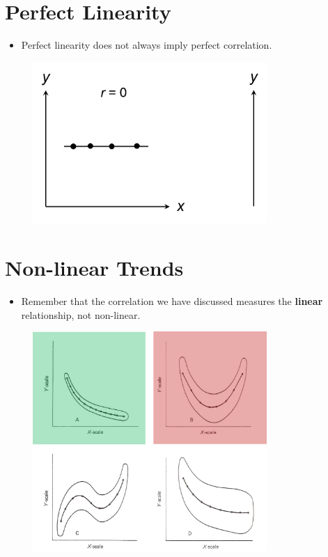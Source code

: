 \documentclass[12pt]{article}
\begin{document}
\section{Perfect Linearity}\label{perfect-linearity}

\begin{itemize}
\itemsep1pt\parskip0pt
\item
  Perfect linearity does not always imply perfect correlation.
\end{itemize}

\begin{figure}[H]
\centering
\includegraphics[width=3.5in]{perfect_nocorr.png}
\caption{}
\end{figure}

\section{Non-linear Trends}\label{non-linear-trends}

\begin{itemize}
\itemsep1pt\parskip0pt
\item
  Remember that the correlation we have discussed measures the
  \textbf{linear} relationship, not non-linear.
\end{itemize}

\begin{figure}[H]
\centering
\includegraphics[width=3.5in]{nonlinear.png}
\caption{}
\end{figure}
\end{document}
